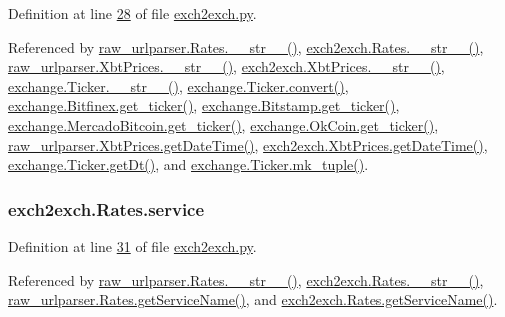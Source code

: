 Definition at line \hyperlink{exch2exch_8py_source_l00028}{28} of file \hyperlink{exch2exch_8py_source}{exch2exch.\+py}.



Referenced by \hyperlink{raw__urlparser_8py_source_l00038}{raw\+\_\+urlparser.\+Rates.\+\_\+\+\_\+str\+\_\+\+\_\+()}, \hyperlink{exch2exch_8py_source_l00042}{exch2exch.\+Rates.\+\_\+\+\_\+str\+\_\+\+\_\+()}, \hyperlink{raw__urlparser_8py_source_l00074}{raw\+\_\+urlparser.\+Xbt\+Prices.\+\_\+\+\_\+str\+\_\+\+\_\+()}, \hyperlink{exch2exch_8py_source_l00091}{exch2exch.\+Xbt\+Prices.\+\_\+\+\_\+str\+\_\+\+\_\+()}, \hyperlink{exchange_8py_source_l00111}{exchange.\+Ticker.\+\_\+\+\_\+str\+\_\+\+\_\+()}, \hyperlink{exchange_8py_source_l00065}{exchange.\+Ticker.\+convert()}, \hyperlink{exchange_8py_source_l00332}{exchange.\+Bitfinex.\+get\+\_\+ticker()}, \hyperlink{exchange_8py_source_l00401}{exchange.\+Bitstamp.\+get\+\_\+ticker()}, \hyperlink{exchange_8py_source_l00535}{exchange.\+Mercado\+Bitcoin.\+get\+\_\+ticker()}, \hyperlink{exchange_8py_source_l00600}{exchange.\+Ok\+Coin.\+get\+\_\+ticker()}, \hyperlink{raw__urlparser_8py_source_l00059}{raw\+\_\+urlparser.\+Xbt\+Prices.\+get\+Date\+Time()}, \hyperlink{exch2exch_8py_source_l00067}{exch2exch.\+Xbt\+Prices.\+get\+Date\+Time()}, \hyperlink{exchange_8py_source_l00093}{exchange.\+Ticker.\+get\+Dt()}, and \hyperlink{exchange_8py_source_l00096}{exchange.\+Ticker.\+mk\+\_\+tuple()}.

\subsubsection[{\texorpdfstring{service}{service}}]{\setlength{\rightskip}{0pt plus 5cm}exch2exch.\+Rates.\+service}\hypertarget{classexch2exch_1_1_rates_a94c1394b9259d6a7c8f3c12bbd20e685}{}\label{classexch2exch_1_1_rates_a94c1394b9259d6a7c8f3c12bbd20e685}


Definition at line \hyperlink{exch2exch_8py_source_l00031}{31} of file \hyperlink{exch2exch_8py_source}{exch2exch.\+py}.



Referenced by \hyperlink{raw__urlparser_8py_source_l00038}{raw\+\_\+urlparser.\+Rates.\+\_\+\+\_\+str\+\_\+\+\_\+()}, \hyperlink{exch2exch_8py_source_l00042}{exch2exch.\+Rates.\+\_\+\+\_\+str\+\_\+\+\_\+()}, \hyperlink{raw__urlparser_8py_source_l00035}{raw\+\_\+urlparser.\+Rates.\+get\+Service\+Name()}, and \hyperlink{exch2exch_8py_source_l00039}{exch2exch.\+Rates.\+get\+Service\+Name()}.

